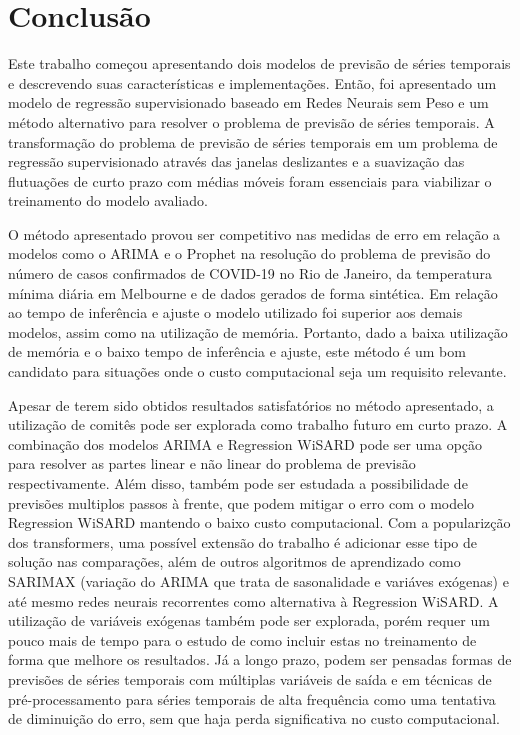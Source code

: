 \chapter{Conclusão}
\label{chap:06}

Este trabalho começou apresentando dois modelos de previsão de séries temporais e descrevendo suas características e implementações. Então, foi apresentado um modelo de regressão supervisionado baseado em Redes Neurais sem Peso e um método alternativo para resolver o problema de previsão de séries temporais. A transformação do problema de previsão de séries temporais em um problema de regressão supervisionado através das janelas deslizantes e a suavização das flutuações de curto prazo com médias móveis foram essenciais para viabilizar o treinamento do modelo avaliado.

O método apresentado provou ser competitivo nas medidas de erro em relação a modelos como o ARIMA e o Prophet na resolução do problema de previsão do número de casos confirmados de COVID-19 no Rio de Janeiro, da temperatura mínima diária em Melbourne e de dados gerados de forma sintética. Em relação ao tempo de inferência e ajuste o modelo utilizado foi superior aos demais modelos, assim como na utilização de memória. Portanto, dado a baixa utilização de memória e o baixo tempo de inferência e ajuste, este método é um bom candidato para situações onde o custo computacional seja um requisito relevante.

Apesar de terem sido obtidos resultados satisfatórios no método apresentado, a utilização de comitês pode ser explorada como trabalho futuro em curto prazo. A combinação dos modelos ARIMA e Regression WiSARD pode ser uma opção para resolver as partes linear e não linear do problema de previsão respectivamente. Além disso, também pode ser estudada a possibilidade de previsões multiplos passos à frente, que podem mitigar o erro com o modelo Regression WiSARD mantendo o baixo custo computacional. Com a popularizção dos transformers, uma possível extensão do trabalho é adicionar esse tipo de solução nas comparações, além de outros algoritmos de aprendizado como SARIMAX (variação do ARIMA que trata de sasonalidade e variáves exógenas) e até mesmo redes neurais recorrentes como alternativa à Regression WiSARD. A utilização de variáveis exógenas também pode ser explorada, porém requer um pouco mais de tempo para o estudo de como incluir estas no treinamento de forma que melhore os resultados. Já a longo prazo, podem ser pensadas formas de previsões de séries temporais com múltiplas variáveis de saída e em técnicas de pré-processamento para séries temporais de alta frequência como uma tentativa de diminuição do erro, sem que haja perda significativa no custo computacional.

